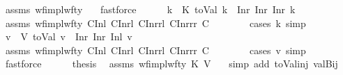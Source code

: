 \begin{isabellebody}
\ assms\ wf{\isacharunderscore}{\kern0pt}impl{\isacharunderscore}{\kern0pt}wf{\isacharunderscore}{\kern0pt}ty\ {\isachardoublequoteopen}{}{\isachardoublequoteclose}\ \isamarkupfalse%
\ fastforce\isanewline
\ \ \ \ \isamarkupfalse%
\ k{\isacharprime}{\kern0pt}\ \ K{\isacharcolon}{\kern0pt}\ {\isachardoublequoteopen}toVal{}{}{}{}\ k\ {\isacharequal}{\kern0pt}\ Inr\ {\isacharparenleft}{\kern0pt}Inr\ {\isacharparenleft}{\kern0pt}Inr\ k{\isacharprime}{\kern0pt}{\isacharparenright}{\kern0pt}{\isacharparenright}{\kern0pt}{\isachardoublequoteclose}\isanewline
\ \ \ \ \ \ \isamarkupfalse%
\ assms\ wf{\isacharunderscore}{\kern0pt}impl{\isacharunderscore}{\kern0pt}wf{\isacharunderscore}{\kern0pt}ty\ C{}Inl\ C{}Inrl\ C{}Inrrl\ C{}Inrrr\ C\isanewline
\ \ \ \ \ \ \isamarkupfalse%
\ {\isacharparenleft}{\kern0pt}cases\ k{\isacharsemicolon}{\kern0pt}\ simp{\isacharparenright}{\kern0pt}\isanewline
\ \ \ \ \isamarkupfalse%
\ v{\isacharprime}{\kern0pt}\ \ V{\isacharcolon}{\kern0pt}\ {\isachardoublequoteopen}toVal{}{}{}{}\ v\ {\isacharequal}{\kern0pt}\ Inr\ {\isacharparenleft}{\kern0pt}Inr\ {\isacharparenleft}{\kern0pt}Inl\ v{\isacharprime}{\kern0pt}{\isacharparenright}{\kern0pt}{\isacharparenright}{\kern0pt}{\isachardoublequoteclose}\isanewline
\ \ \ \ \ \ \isamarkupfalse%
\ assms\ wf{\isacharunderscore}{\kern0pt}impl{\isacharunderscore}{\kern0pt}wf{\isacharunderscore}{\kern0pt}ty\ C{}Inl\ C{}Inrl\ C{}Inrrl\ C{}Inrrr\ C\isanewline
\ \ \ \ \ \ \isamarkupfalse%
\ {\isacharparenleft}{\kern0pt}cases\ v{\isacharsemicolon}{\kern0pt}\ simp{\isacharparenright}{\kern0pt}\ \isamarkupfalse%
\ fastforce\isanewline
\ \ \ \ \isamarkupfalse%
\ {\isacharquery}{\kern0pt}thesis\ \isamarkupfalse%
\ assms\ wf{\isacharunderscore}{\kern0pt}impl{\isacharunderscore}{\kern0pt}wf{\isacharunderscore}{\kern0pt}ty\ K\ V\ {\isachardoublequoteopen}{}{\isachardoublequoteclose}\ \isamarkupfalse%
\ {\isacharparenleft}{\kern0pt}simp\ add{\isacharcolon}{\kern0pt}\ toVal{}{}{}{}{\isacharunderscore}{\kern0pt}inj\ valBij{\isacharparenright}{\kern0pt}\isanewline
\ \ \isamarkupfalse%

\end{isabellebody}
